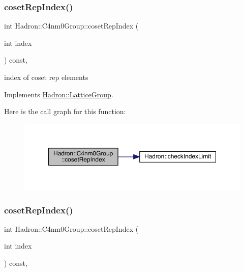 \subsubsection{\texorpdfstring{cosetRepIndex()}{cosetRepIndex()}\hspace{0.1cm}{\footnotesize\ttfamily [1/2]}}
{\footnotesize\ttfamily int Hadron\+::\+C4nm0\+Group\+::coset\+Rep\+Index (\begin{DoxyParamCaption}\item[{int}]{index }\end{DoxyParamCaption}) const\hspace{0.3cm}{\ttfamily [inline]}, {\ttfamily [virtual]}}

index of coset rep elements 

Implements \mbox{\hyperlink{structHadron_1_1LatticeGroup_a7e3b9b5e2f596e6c40d64aa939a3ad6c}{Hadron\+::\+Lattice\+Group}}.

Here is the call graph for this function\+:
\nopagebreak
\begin{figure}[H]
\begin{center}
\leavevmode
\includegraphics[width=350pt]{da/da1/structHadron_1_1C4nm0Group_abac118ef8b96cecf62143c917e23736e_cgraph}
\end{center}
\end{figure}
\mbox{\label{structHadron_1_1C4nm0Group_abac118ef8b96cecf62143c917e23736e}} 
\subsubsection{\texorpdfstring{cosetRepIndex()}{cosetRepIndex()}\hspace{0.1cm}{\footnotesize\ttfamily [2/2]}}
{\footnotesize\ttfamily int Hadron\+::\+C4nm0\+Group\+::coset\+Rep\+Index (\begin{DoxyParamCaption}\item[{int}]{index }\end{DoxyParamCaption}) const\hspace{0.3cm}{\ttfamily [inline]}, {\ttfamily [virtual]}}

